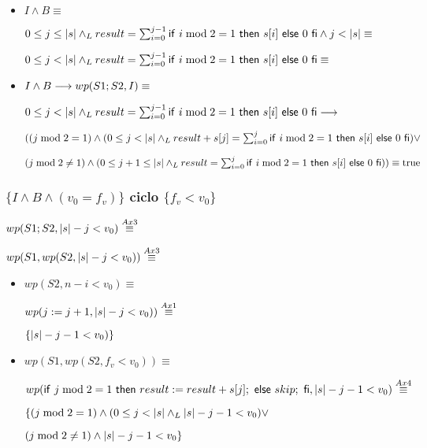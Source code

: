 \documentclass{article}
\begin{document}
\begin{itemize}
    \item $I \wedge B \equiv$
    
    $0 \leq j \leq |s| \land _L result = \sum_{i=0}^{j-1} \mathsf{if}\ i \bmod 2 = 1\ \mathsf{then}\ s[i]\ \mathsf{else}\ 0\ \mathsf{fi} \wedge j < |s| \equiv$

    $0 \leq j < |s| \land _L result = \sum_{i=0}^{j-1} \mathsf{if}\ i \bmod 2 = 1\ \mathsf{then}\ s[i]\ \mathsf{else}\ 0\ \mathsf{fi} \equiv$

    \item $I \wedge B \longrightarrow wp(S1;S2, I) \equiv$

    $0 \leq j < |s| \land _L result = \sum_{i=0}^{j-1} \mathsf{if}\ i \bmod 2 = 1\ \mathsf{then}\ s[i]\ \mathsf{else}\ 0\ \mathsf{fi} \longrightarrow$

    $((j \bmod 2 = 1) \wedge (0 \leq j < |s| \land _L result + s[j] = \sum_{i=0}^{j} \mathsf{if}\ i \bmod 2 = 1\ \mathsf{then}\ s[i]\ \mathsf{else}\ 0\ \mathsf{fi}) \vee $

    $ (j \bmod 2 \neq 1) \wedge (0 \leq j+1 \leq |s| \land _L result = \sum_{i=0}^{j} \mathsf{if}\ i \bmod 2 = 1\ \mathsf{then}\ s[i]\ \mathsf{else}\ 0\ \mathsf{fi})) \equiv \mathrm{true}$

\end{itemize}

\subsubsection*{$\{I \wedge B \wedge (v_{0} = f_{v})\}$ ciclo $\{f_{v} < v_{0}\}$}

$wp(S1;S2, |s|-j<v_{0}) \stackrel{Ax3}{\equiv}$

$wp(S1, wp(S2, |s|-j<v_{0})) \stackrel{Ax3}{\equiv}$

\begin{itemize}
    \item $wp(S2, n-i<v_{0}) \equiv$
    
    $ wp(j:= j+1, |s|-j<v_{0})) \stackrel{Ax1}{\equiv}$

    $\{|s|-j-1<v_{0}) \}$

    \item $wp(S1, wp(S2, f_{v} < v_{0})) \equiv$

    $wp(\mathsf{if}\ j \bmod 2 = 1\ \mathsf{then}\ result:= result + s[j];\ \mathsf{else}\ skip;\ \mathsf{fi}, |s|-j-1<v_{0}) \stackrel{Ax4}{\equiv}$

    $\{(j \bmod 2 = 1) \wedge (0 \leq j < |s| \land _L |s|-j-1<v_{0}) \vee $

    $ (j \bmod 2 \neq 1) \wedge |s|-j-1<v_{0}\}$

\end{itemize}
\end{document}
